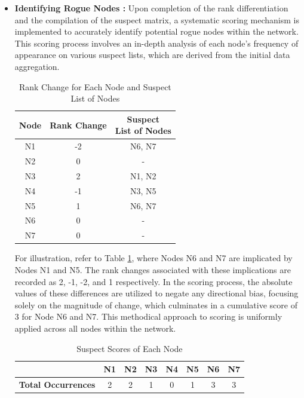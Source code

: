 \documentclass{sn-jnl}%
\begin{document}
\begin{itemize}
\item \textbf{Identifying Rogue Nodes :} Upon completion of the rank differentiation and the compilation of the suspect matrix, a systematic scoring mechanism is implemented to accurately identify potential rogue nodes within the network. This scoring process involves an in-depth analysis of each node’s frequency of appearance on various suspect lists, which are derived from the initial data aggregation.
\begin{table}[htbp]
\centering
\caption{Rank Change for Each Node and Suspect List of Nodes}
\label{tab:rank_change_suspect_list}
\begin{tabular}{|c|c|c|}
\hline
\textbf{Node} & \textbf{Rank Change} & \makecell{\textbf{Suspect} \\ \textbf{List of Nodes}} \\
\hline
N1 & -2 & N6, N7 \\
\hline
N2 & 0 & - \\
\hline
N3 & 2 & N1, N2 \\
\hline
N4 & -1 & N3, N5 \\
\hline
N5 & 1 & N6, N7 \\
\hline
N6 & 0 & - \\
\hline
N7 & 0 & - \\
\hline
\end{tabular}
\end{table}
For illustration, refer to Table \ref{tab:rank_change_suspect_list}, where Nodes N6 and N7 are implicated by Nodes N1 and N5. The rank changes associated with these implications are recorded as 2, -1, -2, and 1 respectively. In the scoring process, the absolute values of these differences are utilized to negate any directional bias, focusing solely on the magnitude of change, which culminates in a cumulative score of 3 for Node N6 and N7. This methodical approach to scoring is uniformly applied across all nodes within the network. 
\begin{table}[htbp]
\centering
\caption{Suspect Scores of Each Node}
\label{tab:total_suspect_scores}
\begin{tabular}{|c|c|c|c|c|c|c|c|}
\hline
\textbf{} & \textbf{N1} & \textbf{N2} & \textbf{N3} & \textbf{N4} & \textbf{N5} & \textbf{N6} & \textbf{N7} \\
\hline
\textbf{Total Occurrences} & 2 & 2 & 1 & 0 & 1 & 3 & 3 \\
\hline
\end{tabular}
\end{table}


\end{itemize}
\end{document}
